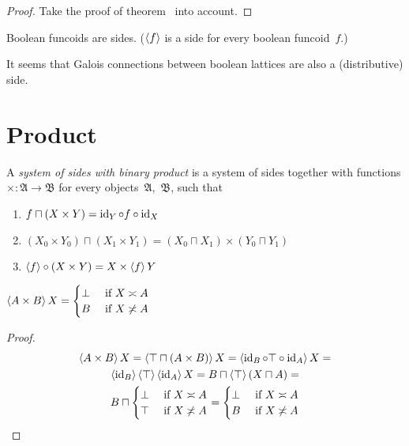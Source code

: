 \begin{proof}
Take the proof of theorem~ into account.
\end{proof}

Boolean funcoids  are sides.
($\left\langle f\right\rangle$ is a side for every boolean funcoid~$f$.)

It seems  that Galois connections between boolean lattices 
are also a (distributive) side.



\section{Product}

\begin{defn}
A \emph{system of sides with binary product} is a system of sides together with functions $\mathord{\times}:\mathfrak{A}\rightarrow\mathfrak{B}$
for every objects~$\mathfrak{A}$,~$\mathfrak{B}$, such that
\begin{enumerate}
\item \label{f-c-x-y}$f\sqcap(X\times Y) = \operatorname{id}_Y\circ f\circ\operatorname{id}_X$
\item \label{f-xy-x0y0}$(X_0\times Y_0)\sqcap(X_1\times Y_1) = (X_0\sqcap X_1)\times(Y_0\sqcap Y_1)$
\item $\left\langle f\right\rangle\circ(X\times Y) = X\times\left\langle f\right\rangle Y$
\end{enumerate}
\end{defn}

\begin{prop}
$\left\langle A\times B\right\rangle X = \begin{cases}\bot&\text{ if }X\asymp A\\B&\text{ if }X\not\asymp A\end{cases}$
\end{prop}

\begin{proof}
~
\begin{multline*}
\left\langle A\times B\right\rangle X = \left\langle \top\sqcap(A\times B)\right\rangle X = \left\langle \operatorname{id}_B\circ\top\circ\operatorname{id}_A\right\rangle X = \\
\left\langle \operatorname{id}_B\right\rangle\left\langle \top\right\rangle\left\langle \operatorname{id}_A\right\rangle X =
B\sqcap\left\langle \top\right\rangle(X\sqcap A) = \\
B\sqcap\begin{cases}\bot&\text{ if }X\asymp A\\\top&\text{ if }X\not\asymp A\end{cases} =
\begin{cases}\bot&\text{ if }X\asymp A\\B&\text{ if }X\not\asymp A\end{cases}
\end{multline*}
\end{proof}

